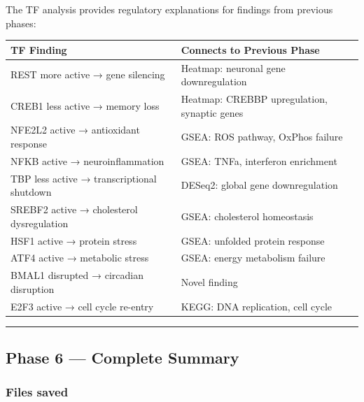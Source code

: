 \documentclass[
]{article}
\begin{document}
The TF analysis provides regulatory explanations for findings from
previous phases:

\begin{longtable}[]{@{}
  >{\raggedright\arraybackslash}p{}
  >{\raggedright\arraybackslash}p{}@{}}
\toprule\noalign{}
\begin{minipage}[b]{\linewidth}\raggedright
TF Finding
\end{minipage} & \begin{minipage}[b]{\linewidth}\raggedright
Connects to Previous Phase
\end{minipage} \\
\midrule\noalign{}
\endhead
\bottomrule\noalign{}
\endlastfoot
REST more active → gene silencing & Heatmap: neuronal gene
downregulation \\
CREB1 less active → memory loss & Heatmap: CREBBP upregulation, synaptic
genes \\
NFE2L2 active → antioxidant response & GSEA: ROS pathway, OxPhos
failure \\
NFKB active → neuroinflammation & GSEA: TNFa, interferon enrichment \\
TBP less active → transcriptional shutdown & DESeq2: global gene
downregulation \\
SREBF2 active → cholesterol dysregulation & GSEA: cholesterol
homeostasis \\
HSF1 active → protein stress & GSEA: unfolded protein response \\
ATF4 active → metabolic stress & GSEA: energy metabolism failure \\
BMAL1 disrupted → circadian disruption & Novel finding \\
E2F3 active → cell cycle re-entry & KEGG: DNA replication, cell cycle \\
\end{longtable}

\begin{center}\rule{0.5\linewidth}{0.5pt}\end{center}

\subsection{Phase 6 --- Complete
Summary}\label{phase-6-complete-summary}

\subsubsection{Files saved}\label{files-saved-3}
\end{document}
